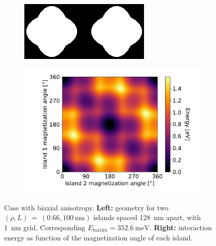 \documentclass[11pt,a4paper,english,twoside]{article}
\begin{document}
\begin{figure}
    \centering
    \begin{subfigure}[c]{4cm} %
         \centering
         \includegraphics[width=\textwidth]{Figures/two_islands/Geometry/geom_r0.66_s100_d128_a0,0_cell1nm.png}
     \end{subfigure}
    \begin{subfigure}[c]{0.7\columnwidth}
         \centering
         \includegraphics[width=\textwidth]{Figures/two_islands/EnergyLandscape/Int_a0Pi,0Pi_d128_r0.66,0.66_cell1nm.pdf}
     \end{subfigure}
    \caption{Case with biaxial anisotropy. \textbf{Left:} geometry for two $(\rho, L)~=~(0.66, \SI{100}{\nano\metre})$ islands spaced \SI{128}{\nano\metre} apart, with \SI{1}{\nano\metre} grid. Corresponding $E_\mathrm{barrier}=\SI{352.6}{\milli\electronvolt}$. \textbf{Right:} interaction energy as function of the magnetization angle of each island.}
    \label{fig:two-islands_interaction_(r0.66_L100)_a0and0}
\end{figure}
\end{document}
